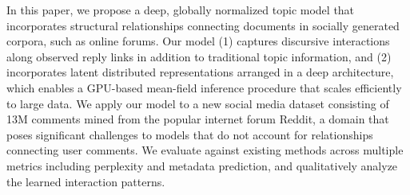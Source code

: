 In this paper, we propose a deep, globally normalized topic model that incorporates structural relationships connecting documents in socially generated corpora, such as online forums. Our model (1) captures discursive interactions along observed reply links in addition to traditional topic information, and (2) incorporates latent distributed representations arranged in a deep architecture, which enables a GPU-based mean-field inference procedure that scales efficiently to large data. We apply our model to a new social media dataset consisting of 13M comments mined from the popular internet forum Reddit, a domain that poses significant challenges to models that do not account for relationships connecting user comments.  We evaluate against existing methods across multiple metrics including perplexity and metadata prediction, and qualitatively analyze the learned interaction patterns.
